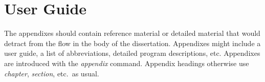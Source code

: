\documentclass[a4paper,11pt]{report}
\begin{document}

\chapter{User Guide}			%

\label{guide}

The appendixes should contain reference material or detailed material that would
detract from the flow in the body of the dissertation. Appendixes might include
a user guide, a list of abbreviations, detailed program descriptions, etc.
Appendixes are introduced with the \textit{{\bs}appendix} command. Appendix
headings otherwise use \textit{{\bs}chapter}, \textit{{\bs}section}, etc.\ as
usual.
\end{document}

